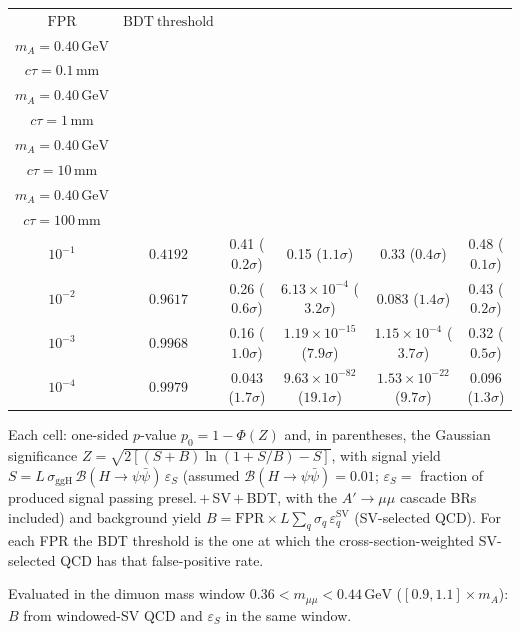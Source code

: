 \documentclass[10pt,a4paper]{article}
\begin{document}
{\begin{tabular}{cccccc}
\toprule
$\mathrm{FPR}$ & $\mathrm{BDT\ threshold}$ & \shortstack{$m_{\pi}=4\,\mathrm{GeV}$\\$m_{A}=0.40\,\mathrm{GeV}$\\$c\tau=0.1\,\mathrm{mm}$} & \shortstack{$m_{\pi}=4\,\mathrm{GeV}$\\$m_{A}=0.40\,\mathrm{GeV}$\\$c\tau=1\,\mathrm{mm}$} & \shortstack{$m_{\pi}=4\,\mathrm{GeV}$\\$m_{A}=0.40\,\mathrm{GeV}$\\$c\tau=10\,\mathrm{mm}$} & \shortstack{$m_{\pi}=4\,\mathrm{GeV}$\\$m_{A}=0.40\,\mathrm{GeV}$\\$c\tau=100\,\mathrm{mm}$} \\
\midrule
$10^{-1}$ & $0.4192$ & 0.41 ($0.2\sigma$) & 0.15 ($1.1\sigma$) & 0.33 ($0.4\sigma$) & 0.48 ($0.1\sigma$)\\
$10^{-2}$ & $0.9617$ & 0.26 ($0.6\sigma$) & $6.13\times10^{-4}$ ($3.2\sigma$) & 0.083 ($1.4\sigma$) & 0.43 ($0.2\sigma$)\\
$10^{-3}$ & $0.9968$ & 0.16 ($1.0\sigma$) & $1.19\times10^{-15}$ ($7.9\sigma$) & $1.15\times10^{-4}$ ($3.7\sigma$) & 0.32 ($0.5\sigma$)\\
$10^{-4}$ & $0.9979$ & 0.043 ($1.7\sigma$) & $9.63\times10^{-82}$ ($19.1\sigma$) & $1.53\times10^{-22}$ ($9.7\sigma$) & 0.096 ($1.3\sigma$)\\
\bottomrule
\end{tabular}

{\small Each cell: one-sided $p$-value $p_0=1-\Phi(Z)$ and, in parentheses, the Gaussian significance $Z=\sqrt{2\left[(S{+}B)\ln(1{+}S/B)-S\right]}$, with signal yield $S=L\,\sigma_{\mathrm{ggH}}\,\mathcal{B}(H\to\psi\bar{\psi})\,\varepsilon_S$ (assumed $\mathcal{B}(H\to\psi\bar{\psi})=0.01$; $\varepsilon_S=$ fraction of produced signal passing presel.\,$+$\,SV\,$+$\,BDT, with the $A'\to\mu\mu$ cascade BRs included) and background yield $B=\mathrm{FPR}\times L\sum_q\sigma_q\,\varepsilon_q^{\mathrm{SV}}$ (SV-selected QCD). For each FPR the BDT threshold is the one at which the cross-section-weighted SV-selected QCD has that false-positive rate.}

{\small Evaluated in the dimuon mass window $0.36<m_{\mu\mu}<0.44\,\mathrm{GeV}$ ($[0.9,1.1]\times m_A$): $B$ from windowed-SV QCD and $\varepsilon_S$ in the same window.}

}\clearpage
\end{document}
